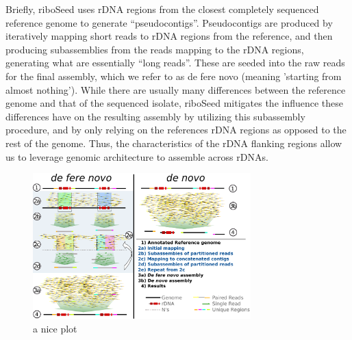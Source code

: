 \documentclass[11pt]{article}
\begin{document}
\begin{linenumbers}
Briefly, riboSeed uses rDNA regions from the closest completely sequenced reference genome to generate “pseudocontigs”. Pseudocontigs are produced by iteratively mapping short reads to rDNA  regions from the reference, and then producing subassemblies from the reads mapping to the rDNA regions, generating what are essentially “long reads”. These are seeded into the raw reads for the final assembly, which we refer to as de fere novo (meaning 'starting from almost nothing'). While there are usually many differences between the reference genome and that of the sequenced isolate, riboSeed mitigates the influence these differences have on the resulting assembly by utilizing this subassembly procedure, and by only relying on the references rDNA regions as opposed to the rest of the genome. Thus, the characteristics of the rDNA flanking regions allow us to leverage genomic architecture to assemble across rDNAs.


\begin{figure}[h]
    \centering
    \includegraphics[width=0.75\textwidth]{riboSeed_v11}
    \caption{a nice plot}
    \label{fig:overview}
\end{figure}









\end{linenumbers}
\end{document}
